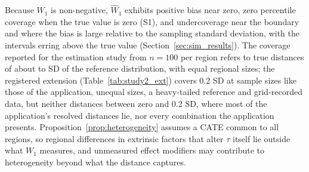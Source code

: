 \documentclass[AMA,Times1COL]{WileyNJDv5}
\begin{document}
Because $W_1$ is non-negative, $\widehat{W}_1$ exhibits positive bias near zero, zero percentile coverage when the true value is zero (S1), and undercoverage near the boundary and where the bias is large relative to the sampling standard deviation, with the intervals erring above the true value (Section~\ref{sec:sim_results}).\cite{andrews2000} The coverage reported for the estimation study from $n = 100$ per region refers to true distances of about  to  SD of the reference distribution, with equal regional sizes; the registered extension (Table~\ref{tab:study2_ext}) covers 0.2 SD at sample sizes like those of the application, unequal sizes, a heavy-tailed reference and grid-recorded data, but neither distances between zero and 0.2 SD, where most of the application's resolved distances lie, nor every combination the application presents. Proposition~\ref{prop:heterogeneity} assumes a CATE common to all regions, so regional differences in extrinsic factors that alter $\tau$ itself lie outside what $W_1$ measures, and unmeasured effect modifiers may contribute to heterogeneity beyond what the distance captures.
\end{document}
